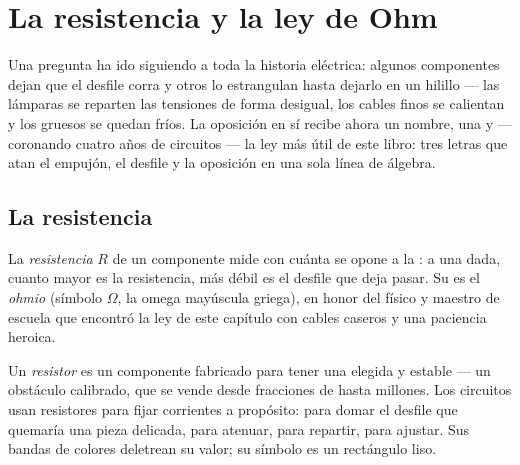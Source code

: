 \chapter{La resistencia y la ley de Ohm}\label{ch:g8:ohms-law}

Una pregunta ha ido siguiendo a toda la historia eléctrica: algunos
componentes dejan que el desfile corra y otros lo estrangulan hasta
dejarlo en un hilillo --- las lámparas se reparten las
tensiones de forma desigual, los cables finos se calientan y los
gruesos se quedan fríos. La oposición en sí recibe ahora un nombre, una
 y --- coronando cuatro años de circuitos --- la ley más
útil de este libro: tres letras que atan el empujón, el desfile y la
oposición en una sola línea de álgebra.

\section{La resistencia}

\begin{definition}[Resistencia]\label{def:g8:ohms-law:resistance}
La \emph{resistencia} $R$ de un componente
mide con cuánta  se opone a la : a una  dada, cuanto mayor es la resistencia,
más débil es el desfile que deja pasar. Su  es el
\emph{ohmio} (símbolo $\Omega$, la omega mayúscula
griega), en honor del físico y maestro de escuela que encontró la ley
de este capítulo con cables caseros y una paciencia heroica.
\end{definition}

\begin{definition}[Resistor]\label{def:g8:ohms-law:resistor}
Un \emph{resistor} es un componente fabricado para
tener una  elegida y estable --- un obstáculo
calibrado, que se vende desde fracciones de  hasta
millones. Los circuitos usan resistores para fijar corrientes a
propósito: para domar el desfile que quemaría una pieza delicada, para
atenuar, para repartir, para ajustar. Sus bandas de colores deletrean
su valor; su símbolo es un rectángulo liso.
\end{definition}

